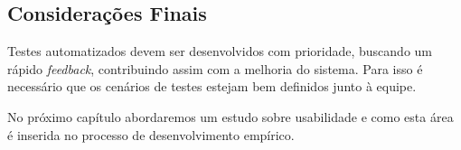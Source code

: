 \subsection{Considerações Finais}

Testes automatizados devem ser desenvolvidos com prioridade, buscando um rápido 
\textit{feedback}, contribuindo assim com a melhoria do sistema. Para isso é 
necessário que os cenários de testes estejam bem definidos junto à equipe.

No próximo capítulo abordaremos um estudo sobre usabilidade e como esta área é inserida no processo de desenvolvimento empírico.

